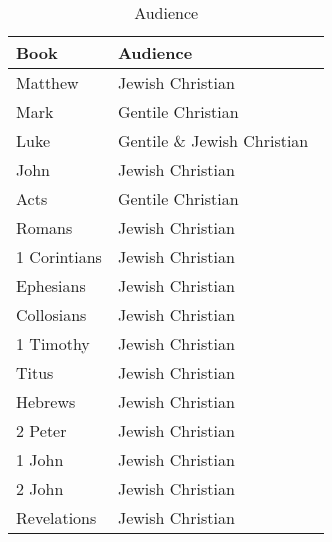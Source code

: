 \documentclass{article}
\begin{document}
\begin{table}
    \centering
    \renewcommand\arraystretch{1.3}
    \begin{tabular}{@{}ll@{}}
    \toprule
        Book & Audience \\
    \midrule
        Matthew & Jewish Christian \\
        Mark & Gentile Christian~\cite{Schroter2010} \\
        Luke & Gentile \& Jewish Christian~\cite{Thompson2010} \\
        John & Jewish Christian \\
        Acts & Gentile Christian \\
        Romans & Jewish Christian \\
        1 Corintians & Jewish Christian \\
        Ephesians & Jewish Christian \\
        Collosians & Jewish Christian \\
        1 Timothy & Jewish Christian \\
        Titus & Jewish Christian \\
        Hebrews & Jewish Christian \\
        2 Peter & Jewish Christian \\
        1 John & Jewish Christian \\
        2 John & Jewish Christian \\
        Revelations & Jewish Christian \\
    \bottomrule
    \end{tabular}
    \caption{Audience}
    \label{audience}
\end{table}
\end{document}
